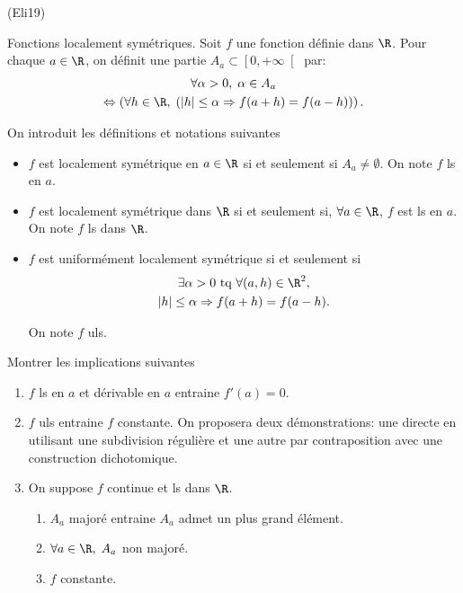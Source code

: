 \begin{tiny}(Eli19)\end{tiny} Fonctions localement symétriques.\newline
Soit $f$ une fonction définie dans $\R$. Pour chaque $a\in \R$, on définit une partie $A_a \subset \left[ 0, + \infty\right[$ par:
\begin{multline*}
  \forall \alpha >0, \;\alpha \in A_a \\
  \Leftrightarrow \left( \forall h \in \R, \;\left( |h| \leq \alpha \Rightarrow f(a+h) = f(a-h)\right) \right).
\end{multline*}

On introduit les définitions et notations suivantes
\begin{itemize}
  \item $f$ est localement symétrique en $a\in \R$ si et seulement si $A_a \neq \emptyset$. On note $f$ ls en $a$.
  \item $f$ est localement symétrique dans $\R$ si et seulement si, $\forall a\in \R$, $f$ est ls en $a$. On note $f$ ls dans $\R$.
  \item $f$ est uniformément localement symétrique si et seulement si
  \begin{multline*}
    \exists \alpha >0 \text{ tq } \forall (a,h) \in \R^2, \\ 
    |h| \leq \alpha \Rightarrow f(a+h) = f(a-h).
  \end{multline*}

  On note $f$ uls.
\end{itemize}
Montrer les implications suivantes
\begin{enumerate}
  \item $f$ ls en $a$ et dérivable en $a$ entraine $f'(a) = 0$.
  \item $f$ uls entraine $f$ constante. On proposera deux démonstrations: une directe en utilisant une subdivision régulière et une autre par contraposition avec une construction dichotomique.
  \item On suppose $f$ continue et ls dans $\R$.
  \begin{enumerate}
    \item $A_a$ majoré entraine $A_a$ admet un plus grand élément.
    \item $\forall a\in \R, \;A_a$ non majoré.
    \item $f$ constante.
  \end{enumerate}

\end{enumerate}
